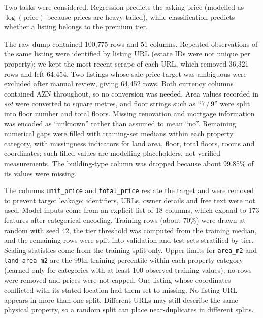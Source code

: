 \documentclass[10pt,twocolumn,a4paper]{article}
\begin{document}
Two tasks were considered. Regression predicts the asking price (modelled
as $\log(\text{price})$ because prices are heavy-tailed), while classification
predicts whether a listing belongs to the premium tier.

The raw dump contained 100{,}775 rows and 51 columns. Repeated observations of
the same listing were identified by listing URL (estate IDs were not unique per
property); we kept the most recent scrape of each URL, which removed 36{,}321
rows and left 64{,}454. Two listings whose sale-price target was ambiguous were
excluded after manual review, giving 64{,}452 rows. Both currency columns
contained AZN throughout, so no conversion was needed. Area values recorded in
\emph{sot} were converted to square metres, and floor strings such as ``7\,/\,9''
were split into floor number and total floors. Missing renovation and mortgage
information was encoded as ``unknown'' rather than assumed to mean ``no''.
Remaining numerical gaps were filled with training-set medians within each
property category, with missingness indicators for land area, floor, total
floors, rooms and coordinates; such filled values are modelling placeholders,
not verified measurements. The building-type column was dropped because about
99.85\% of its values were missing.

The columns \texttt{unit\_price} and \texttt{total\_price} restate the target
and were removed to prevent target leakage; identifiers, URLs, owner details
and free text were not used. Model inputs come from an explicit list of 18
columns, which expand to 173 features after categorical encoding. Training rows
(about 70\%) were drawn at random with seed 42, the tier threshold was computed
from the training median, and the remaining rows were split into validation and
test sets stratified by tier. Scaling statistics come from the training split
only. Upper limits for \texttt{area\_m2} and \texttt{land\_area\_m2} are the 99th training percentile within each property category (learned only for categories with at least 100 observed training values); no rows were removed and prices were not capped. One listing whose coordinates conflicted with its stated location had them set to missing. No listing URL appears in more than one split. Different URLs may still describe the same physical property, so a
random split can place near-duplicates in different splits.
\end{document}
